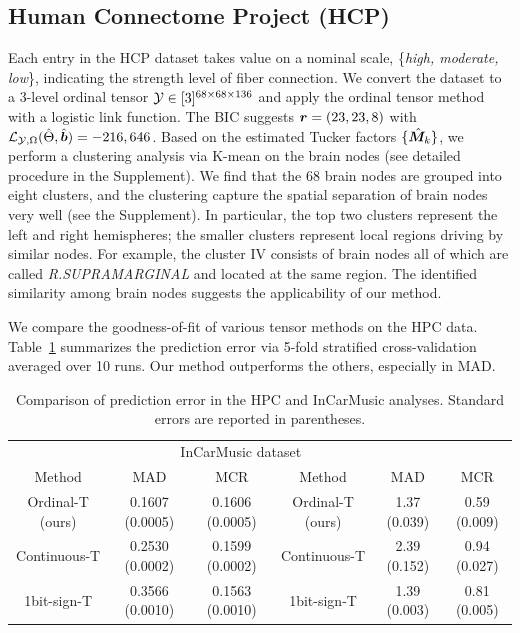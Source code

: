 \documentclass[11pt]{article}
\theoremstyle{plain}
\theoremstyle{definition}
\begin{document}
\subsection{Human Connectome Project (HCP)}
Each entry in the HCP dataset takes value on a nominal scale, \{{\it high, moderate, low}\}, indicating the strength level of fiber connection. We convert the dataset to a 3-level ordinal tensor $\mathcal{Y}\in[3]^{68\times 68\times 136}$ and apply the ordinal tensor method with a logistic link function. The BIC suggests $\bm{r} = (23,23,8)$ with $\mathcal{L}_{\mathcal{Y},\Omega}(\hat{\Theta},\hat{\bm{b}}) = -216,646$. Based on the estimated Tucker factors $\{\hat {\bm M}_k\}$, we perform a clustering analysis via K-mean on the brain nodes (see detailed procedure in the Supplement). We find that the 68 brain nodes are grouped into eight clusters, and the clustering capture the spatial separation of brain nodes very well (see the Supplement). In particular, the top two clusters represent the left and right hemispheres; the smaller clusters represent local regions driving by similar nodes. For example, the cluster IV consists of brain nodes all of which are called {\it R.SUPRAMARGINAL} and located at the same region. The identified similarity among brain nodes suggests the applicability of our method.

We compare the goodness-of-fit of various tensor methods on the HPC data. Table~\ref{table:CV} summarizes the prediction error via 5-fold stratified cross-validation averaged over 10 runs. Our method outperforms the others, especially in MAD.

\begin{table}[http]
\begin{tabular}{c|c|c||c|c|c}
\Xhline{2\arrayrulewidth}
\multicolumn{3}{c||}{Human Connectome Project (HCP) dataset} & \multicolumn{3}{c}{InCarMusic dataset}\\
\Xhline{2\arrayrulewidth}
Method                    & MAD & MCR & Method                    & MAD & MCR\\
\hline
Ordinal-T (ours) & 0.1607 (0.0005)& 0.1606 (0.0005)& Ordinal-T (ours) & 1.37 (0.039) &  0.59 (0.009)\\
 Continuous-T&0.2530 (0.0002)&0.1599 (0.0002)& Continuous-T & 2.39 (0.152)&0.94 (0.027)\\

 1bit-sign-T&0.3566 (0.0010)&0.1563 (0.0010)& 1bit-sign-T&1.39 (0.003)& 0.81 (0.005)\\
\hline
\end{tabular}

\caption{Comparison of prediction error in the HPC and InCarMusic analyses. Standard errors are reported in parentheses.}\label{table:CV}
\end{table}
\end{document}
